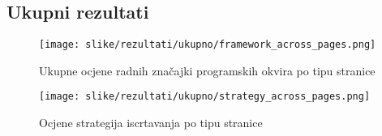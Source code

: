 \subsection{Ukupni rezultati}

\begin{figure}[H]
    \centering
    \texttt{[image: slike/rezultati/ukupno/framework\_across\_pages.png]}
    \caption{Ukupne ocjene radnih značajki programskih okvira po tipu stranice}
    \label{fig:ukupne_ocjene_radnih_znacajki}
\end{figure}

\begin{figure}[H]
    \centering
    \texttt{[image: slike/rezultati/ukupno/strategy\_across\_pages.png]}
    \caption{Ocjene strategija iscrtavanja po tipu stranice}
    \label{fig:ukupne_ocjene_strategija_iscrtavanja}
\end{figure}


